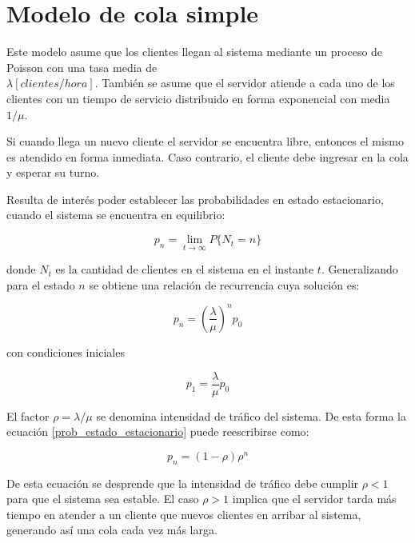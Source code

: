 \documentclass{sig-alternate}
\begin{document}
\section{Modelo de cola simple}\label{modelo}

Este modelo asume que los clientes llegan al sistema mediante un proceso de
Poisson con una tasa media de \\ $\lambda[clientes/hora]$. Tambi\'{e}n se asume
que el servidor atiende a cada uno de los clientes con un tiempo de servicio
distribuido en forma exponencial con media $1/\mu$.


Si cuando llega un nuevo cliente el servidor se encuentra libre, entonces el 
mismo es atendido en forma inmediata. Caso contrario, el cliente debe ingresar
en la cola y esperar su turno.


Resulta de inter\'{e}s poder establecer las probabilidades en estado estacionario,
cuando el sistema se encuentra en equilibrio:

\begin{equation}
\label{probabilidad_largo_plazo}
p_{n} = \lim_{t \rightarrow \infty} P \{ N_{t} = n \}
\end{equation}

donde $N_{t}$ es la cantidad de clientes en el sistema en el instante $t$.
Generalizando para el estado $n$ se obtiene una relaci\'{o}n de recurrencia
cuya soluci\'{o}n es:

\begin{equation}
\label{prob_estado_estacionario}
p_{n} = \left( \frac{\lambda}{\mu} \right)^{n} p_{0}
\end{equation}

con condiciones iniciales

\begin{equation}
\label{prob_estado_estacionario_ci}
p_{1} = \frac{\lambda}{\mu} p_{0}
\end{equation}


El factor $\rho = \lambda / \mu$ se denomina intensidad de tr\'{a}fico del
sistema. De esta forma la ecuaci\'{o}n \eqref{prob_estado_estacionario} puede
reescribirse como:

\begin{equation}
\label{prob_estado_estacionario_con_rho}
p_{n} = (1 - \rho) \rho^{n}
\end{equation}


De esta ecuaci\'{o}n se desprende que la intensidad de tr\'{a}fico debe
cumplir $\rho < 1$ para que el sistema sea estable. El caso $\rho > 1$
implica que el servidor tarda m\'{a}s tiempo en atender a un cliente que nuevos
clientes en arribar al sistema, generando as\'{i} una cola cada vez m\'{a}s 
larga.
\end{document}
